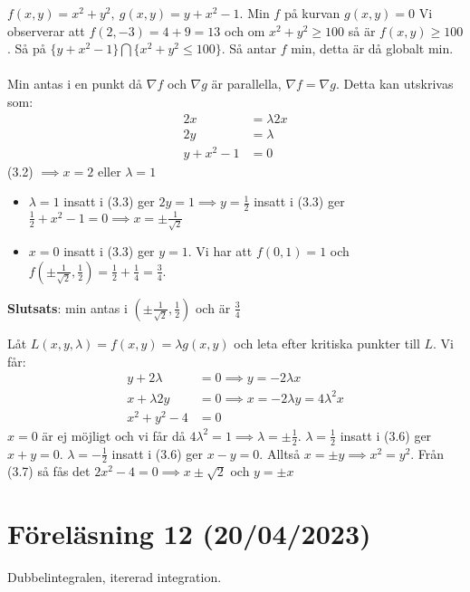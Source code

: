 \documentclass{report}
\begin{document}
\ex{}
{
	$ f(x,y) = x^2+y^2, \: g(x,y) = y+x^2 - 1 $. Min $ f $  på kurvan $ g(x,y) = 0 $
	Vi observerar att $ f(2,-3) = 4+9 = 13 $ och om $ x^2+y^2 \ge 100 $ så är $ f(x,y) \ge 100 $. Så på $ \{ y+x^2-1 \} \bigcap \{ x^2+y^2 \le 100 \}  $. Så antar $ f $ min, detta är då globalt min.\\\\

	Min antas i en punkt då $ \nabla f $ och $ \nabla g $ är parallella, $ \nabla f = \nabla g $. Detta kan utskrivas som:
\begin{align}
	2x &= \lambda 2x\\
	2y &= \lambda\\
	y+x^2-1 &= 0
\end{align}
(3.2) $ \implies x = 2 $ eller $ \lambda = 1 $
\begin{itemize}
	\item $ \lambda = 1 $ insatt i (3.3) ger $ 2y = 1 \implies y = \frac{1}{2}  $ insatt i (3.3) ger $ \frac{1}{2} + x^2 -1 = 0 \implies x = \pm \frac{1}{ \sqrt{2} }  $  
	\item $ x = 0 $ insatt i (3.3) ger $ y = 1 $. Vi har att $ f(0,1) =1 $ och $ f( \pm\frac{1}{ \sqrt{2} }, \frac{1}{2} ) = \frac{1}{2} + \frac{1}{4} = \frac{3}{4} $. 
\end{itemize}
\textbf{Slutsats}: min antas i $(\pm \frac{1}{ \sqrt{2} }, \frac{1}{2} )$ och är $ \frac{3}{4}  $ 
}

{
Låt $ L(x,y, \lambda) = f(x,y) = \lambda g(x,y) $ och leta efter kritiska punkter till $ L $. Vi får:
\begin{align}
	y + 2 \lambda &= 0 \implies y = -2 \lambda x\\
	x + \lambda 2y &= 0 \implies  x = -2 \lambda y = 4 \lambda^2 x\\
	x^2+y^2 - 4 &= 0
\end{align}
$ x = 0 $ är ej möjligt och vi får då $ 4 \lambda^2 = 1 \implies \lambda= \pm \frac{1}{2}  $. $ \lambda = \frac{1}{2}  $ insatt i (3.6) ger $ x + y = 0 $. $ \lambda = - \frac{1}{2}  $ insatt i (3.6) ger $ x - y = 0 $. Alltså $ x = \pm y \implies x^2 = y^2 $. Från (3.7) så fås det $ 2x^2-4 = 0 \implies x \pm \sqrt{2}  $ och $ y = \pm x $   
}

\pagebreak
\section{Föreläsning 12 (20/04/2023)}
Dubbelintegralen, itererad integration.\\\\
\end{document}

